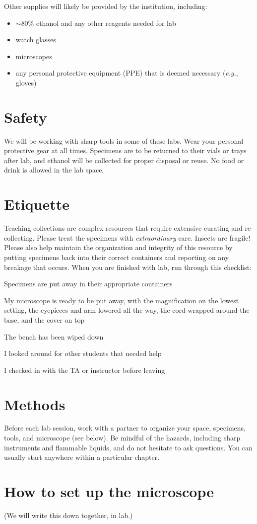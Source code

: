 \noindent{}Other supplies will likely be provided by the institution, including:
\begin{itemize}
    \item $\sim$80\% ethanol and any other reagents needed for lab
    \item watch glasses
    \item microscopes
    \item any personal protective equipment (PPE) that is deemed necessary (\textit{e.g.}, gloves)
\end{itemize}

\section*{Safety}
We will be working with sharp tools in some of these labs. Wear your personal protective gear at all times. Specimens are to be returned to their vials or trays after lab, and ethanol will be collected for proper disposal or reuse. No food or drink is allowed in the lab space.

\section*{Etiquette}
Teaching collections are complex resources that require extensive curating and re-collecting. Please treat the specimens with \textit{extraordinary} care. Insects are fragile! Please also help maintain the organization and integrity of this resource by putting specimens back into their correct containers and reporting on any breakage that occurs. When you are finished with lab, run through this checklist:
\begin{todolist}
  \item Specimens are put away in their appropriate containers
  \item My microscope is ready to be put away, with the magnification on the lowest setting, the eyepieces and arm lowered all the way, the cord wrapped around the base, and the cover on top
  \item The bench has been wiped down
  \item I looked around for other students that needed help
  \item I checked in with the TA or instructor before leaving
\end{todolist}

\section*{Methods}
Before each lab session, work with a partner to organize your space, specimens, tools, and microscope (see below). Be mindful of the hazards, including sharp instruments and flammable liquids, and do not hesitate to ask questions. You can usually start anywhere within a particular chapter.

\clearpage
\section*{How to set up the microscope}
(We will write this down together, in lab.)